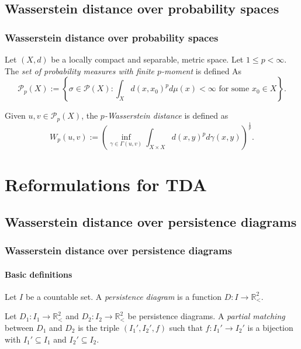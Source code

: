\documentclass[aspectratio=169]{beamer}
\newcommand{\p}{\mathcal P}
\newcommand{\upr}{\mathbb{R}_<^2}
\begin{document}
\subsection{Wasserstein distance over probability spaces}
  \begin{frame}
    \frametitle{Wasserstein distance over probability spaces}
    \begin{definition}
      Let $ (X, d) $ be a locally compact and separable, metric space. Let $ 1 \leq p < \infty $. The {\it set of probability measures with finite $p$-moment} is defined As
      $$
          \p_p (X) := \left\{ \sigma \in \p (X) : \int_X d(x, x_0)^p d \mu (x) < \infty \text{ for some } x_0 \in X \right\}.
      $$
    \end{definition}

    \begin{definition}
      Given $ u, v \in \p_p (X) $, the {\it $p$-Wasserstein distance} is defined as
      $$
          W_p(u, v) := \left( \inf_{\gamma \in \Gamma(u, v)} \int_{X \times X} d(x,y)^p d\gamma(x, y)\right)^{\frac{1}{p}}.
      $$
    \end{definition}
  \end{frame}

\section{Reformulations for TDA}

\subsection{Wasserstein distance over persistence diagrams}
  \begin{frame}
    \frametitle{Wasserstein distance over persistence diagrams}
    \framesubtitle{Basic definitions}
    \begin{definition}
      Let $ I $ be a countable set. A {\it persistence diagram} is a function $ D: I \to \upr $.
    \end{definition}

    \begin{definition}
      Let $ D_1: I_1 \to \upr $ and $ D_2: I_2 \to \upr $ be persistence diagrams. A {\it partial matching} between $ D_1 $ and $ D_2 $ is the triple $ (I_1', I_2', f) $ such that $ f: I_1' \to I_2' $ is a bijection with $ I_1' \subseteq I_1 $ and $ I_2' \subseteq I_2 $.
    \end{definition}
  \end{frame}
\end{document}
